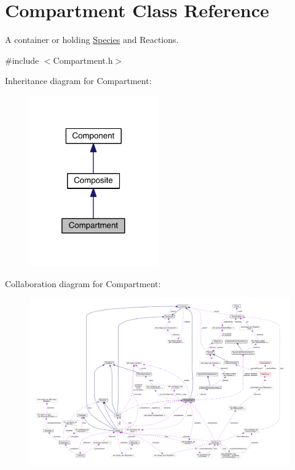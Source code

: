 \hypertarget{classCompartment}{\section{Compartment Class Reference}
\label{classCompartment}
}


A container or holding \hyperlink{classSpecies}{Species} and Reactions.  




{\ttfamily \#include $<$Compartment.\+h$>$}



Inheritance diagram for Compartment\+:\nopagebreak
\begin{figure}[H]
\begin{center}
\leavevmode
\includegraphics[width=157pt]{classCompartment__inherit__graph}
\end{center}
\end{figure}


Collaboration diagram for Compartment\+:\nopagebreak
\begin{figure}[H]
\begin{center}
\leavevmode
\includegraphics[width=350pt]{classCompartment__coll__graph}
\end{center}
\end{figure}
